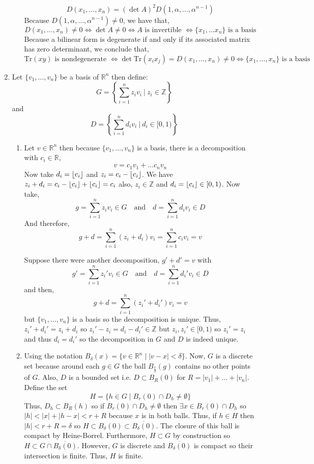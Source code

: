 \documentclass[12pt]{extarticle}
\DeclarePairedDelimiter{\floor}{\lfloor}{\rfloor}
\newcommand{\Z}{\mathbb{Z}}
\newcommand{\ball}[2]{B_{#1} \! \left(#2 \right)}
\newcommand{\R}{\mathbb{R}}
\newcommand{\tr}[1]{\mathrm{Tr} \! \left(#1\right)}
\begin{document}
\begin{enumerate}
\begin{enumerate}
\[D(x_1, \dots, x_n) = (\det{A})^2 D(1, \alpha, \dots, \alpha^{n-1})\]
Because $D(1, \alpha, \dots, \alpha^{n-1}) \neq 0$, we have that,
\[D(x_1, \dots, x_n) \neq 0 \iff \det{A} \neq 0 \iff A \text{ is invertible } \iff \{x_1, \dots x_n\} \text{ is a basis}\] 
Because a bilinear form is degenerate if and only if its associated matrix has zero determinant, we conclude that, \[\tr{xy}  \text{ is nondegenerate } \iff \det{\tr{x_i x_j}} = D(x_1, \dots, x_n) \neq 0  \iff \{x_1, \dots, x_n\} \text{ is a basis}\] 
\end{enumerate}

\item Let $\{v_1, \dots, v_n \}$ be a basis of $\R^n$ then define:
\[G = \left\{ \sum_{i = 1}^n z_i v_i \: \Big| \: z_i \in \Z \right\}\]
and 
\[D = \left\{ \sum_{i = 1}^n d_i v_i \: \Big| \: d_i \in [0, 1) \right\}\]
\begin{enumerate}
\item Let $v \in \R^n$ then because $\{v_1, \dots, v_n \}$ is a basis, there is a decomposition with $c_i \in \R$, \[v = c_1 v_1 + \dots c_n v_n\] Now take $d_i = \floor{c_i}$ and $z_i = c_i - \floor{c_i}$. We have $z_i + d_i = c_i - \floor{c_i} + \floor{c_i} = c_i$ also, $z_i \in \Z$ and $d_i = \floor{c_i} \in [0, 1)$. Now take, \[g = \sum_{i = 1}^n z_i v_i \in G \quad \text{and} \quad d = \sum_{i = 1}^n d_i v_i \in D\]
And therefore, 
\[ g + d = \sum_{i = 1}^n (z_i + d_i) v_i = \sum_{i = 1}^n c_i v_i = v\] 

Suppose there were another decomposition, $g' + d' = v$ with \[g' = \sum_{i = 1}^n z_i' v_i \in G \quad \text{and} \quad d = \sum_{i = 1}^n d_i' v_i \in D\] and then,
\[ g + d = \sum_{i = 1}^n (z_i' + d_i') v_i = v\] but $\{v_1, \dots, v_n \}$ is a basis so the decomposition is unique. Thus, $z_i' + d_i' = z_i + d_i$ so $z_i' - z_i = d_i - d_i' \in \Z$ but $z_i, z_i' \in [0, 1)$ so $z_i' = z_i$ and thus $d_i = d_i'$ so the decomposition in $G$ and $D$ is indeed unique. 

\item Using the notation $\ball{\delta}{x} = \{ v \in \R^n \mid |v - x| < \delta \}$. Now, $G$ is a discrete set because around each $g \in G$ the ball $\ball{\frac{1}{2}}{g}$ contains no other points of $G$. Also, $D$ is a bounded set i.e. $D \subset \ball{R}{0}$ for $R = |v_1| + \dots + |v_n|$. Define the set \[H = \{ h \in G \mid \ball{r}{0} \cap D_h \neq \emptyset \}\]
Thus, $D_h \subset \ball{R}{h}$ so if $\ball{r}{0} \cap D_h \neq \emptyset$ then $\exists x \in \ball{r}{0} \cap D_h$ so $|h| < |x| + |h - x| < r + R$ because $x$ is in both balls. Thus, if $h \in H$ then $|h| < r + R = \delta$ so $H \subset \ball{\delta}{0} \subset \overline{\ball{\delta}{0}}$. The closure of this ball is compact by Heine-Borrel. Furthermore, $H \subset G$ by construction so $H \subset G \cap \overline{\ball{\delta}{0}}$. However, $G$ is discrete and $\overline{\ball{\delta}{0}}$ is compact so their intersection is finite. Thus, $H$ is finite. 
\end{enumerate}

\end{enumerate}
\end{document}
